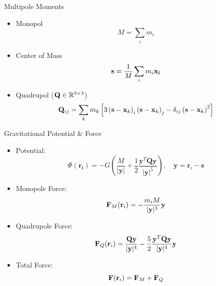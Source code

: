 \begin{frame}{Multipole Moments}
	\begin{itemize}
		\item Monopol
		      \begin{equation}
			      M = \sum_i m_i
		      \end{equation}
		\item Center of Mass
		      \begin{equation}
			      \vb{s} = \frac{1}{M}\sum_im_i\vb{x_i}
		      \end{equation}
		\item Quadrupol ($\vb{Q} \in \mathbb{R}^{3\times3}$)
		      \begin{equation}
			      \vb{Q}_{i j}=\sum_k m_k\left[3\left(\mathbf{s}-\mathbf{x}_k\right)_i\left(\mathbf{s}-\mathbf{x}_k\right)_j-\delta_{i j}\left(\mathbf{s}-\mathbf{x}_k\right)^2\right]
		      \end{equation}
	\end{itemize}
\end{frame}

\begin{frame}{Gravitational Potential \& Force}
	\begin{itemize}
		\item Potential:
		      \begin{equation}
			      \Phi(\mathbf{r_i})=-G\left(\frac{M}{|\mathbf{y}|}+\frac{1}{2} \frac{\mathbf{y}^T \mathbf{Q} \mathbf{y}}{|\mathbf{y}|^5}\right), \quad \mathbf{y}=\mathbf{r}_i-\mathbf{s}
		      \end{equation}
		\item Monopole Force:
		      \begin{equation}
			      \vb{F}_M(\vb{r}_i) = - \frac{m_i  M}{ | \vb{y} | ^3}\vb{y}
		      \end{equation}
		\item Quadrupole Force:
		      \begin{equation}
			      \vb{F}_Q(\vb{r}_i) = \frac{\vb{Q}\vb{y}}{ | \vb{y} | ^4} - \frac{5}{2} \frac{\vb{y}^T \vb{Q} \vb{y}} { | \vb{y} | ^4} \vb{y}
		      \end{equation}
		\item Total Force:
		      \begin{equation}
			      \vb{F}(\vb{r}_i) = \vb{F}_M + \vb{F}_Q
		      \end{equation}
	\end{itemize}
\end{frame}


